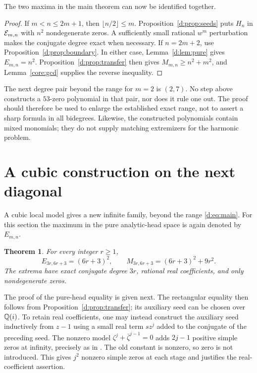 \documentclass[UTF8,11pt]{ctexart}
\newtheorem{thm}{Theorem}[section]
\theoremstyle{definition}
\numberwithin{equation}{section}
\begin{document}
The two maxima in the main theorem can now be identified together.
\begin{proof}
If $m<n\le2m+1$, then $\lfloor n/2\rfloor\le m$.
Proposition~\ref{d:prop:seeds} puts $H_n$ in $\mathcal E_{m,n}$ with $n^2$
nondegenerate zeros. A sufficiently small rational $w^m$ perturbation
makes the conjugate degree exact when necessary. If $n=2m+2$, use
Proposition~\ref{d:prop:boundary}. In either case, Lemma~\ref{d:lem:pure}
gives $E_{m,n}=n^2$.
Proposition~\ref{d:prop:transfer} then gives $M_{m,n}\ge n^2+m^2$, and
Lemma~\ref{core:gcd} supplies the reverse inequality.
\end{proof}

The next degree pair beyond the range for $m=2$ is $(2,7)$. No step above
constructs a $53$-zero polynomial in that pair, nor does it rule one out.
The proof should therefore be used to enlarge the established exact
range, not to assert a sharp formula in all bidegrees. Likewise, the
constructed polynomials contain mixed monomials; they do not supply
matching extremizers for the harmonic problem.

\section{A cubic construction on the next diagonal}\label{c:sec:cubic}
A cubic local model gives a new infinite family, beyond the range
\eqref{d:eq:main}. For this section the maximum in the pure analytic-head
space is again denoted by $E_{m,n}$.
\begin{thm}\label{c:thm:main}
For every integer $r\ge1$,
\begin{equation}\label{c:eq:main}
 E_{3r,6r+3}=(6r+3)^2,\qquad
 M_{3r,6r+3}=(6r+3)^2+9r^2.
\end{equation}
The extrema have exact conjugate degree $3r$, rational real coefficients,
and only nondegenerate zeros.
\end{thm}
The proof of the pure-head equality is given next. The rectangular
equality then follows from Proposition~\ref{d:prop:transfer}; its
auxiliary seed can be chosen over $\mathbb Q(i)$. To retain real coefficients,
one may instead construct the auxiliary seed inductively from $z-1$
using a small real term $s z^j$ added to the conjugate of the preceding
seed. The nonzero model $\zeta^j+\bar\zeta^{j-1}=0$ adds $2j-1$
positive simple zeros at infinity, precisely as in
\cite[proof of Theorem~4.1, pp.~12--14]{SZ24}. The old constant is
nonzero, so zero is not introduced. This gives $j^2$ nonzero simple
zeros at each stage and justifies the real-coefficient assertion.
\end{document}
